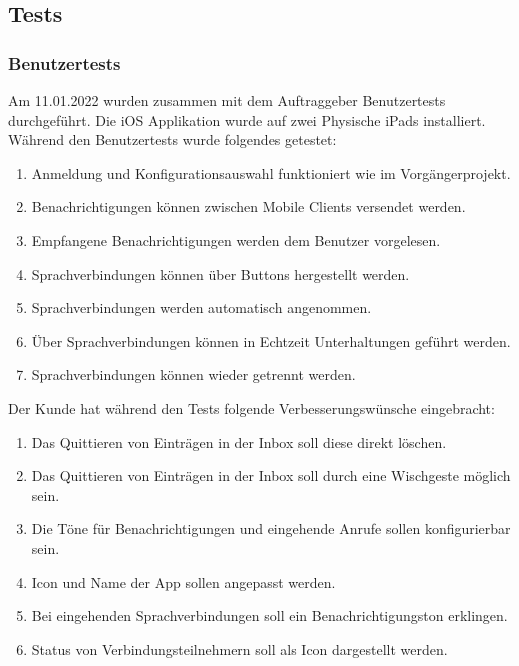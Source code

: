 \subsection{Tests}

\subsubsection{Benutzertests}

Am 11.01.2022 wurden zusammen mit dem Auftraggeber Benutzertests durchgeführt.
Die iOS Applikation wurde auf zwei Physische iPads installiert.
Während den Benutzertests wurde folgendes getestet:

\begin{enumerate}
    \item Anmeldung und Konfigurationsauswahl funktioniert wie im Vorgängerprojekt.
    \item Benachrichtigungen können zwischen Mobile Clients versendet werden.
    \item Empfangene Benachrichtigungen werden dem Benutzer vorgelesen.
    \item Sprachverbindungen können über Buttons hergestellt werden.
    \item Sprachverbindungen werden automatisch angenommen.
    \item Über Sprachverbindungen können in Echtzeit Unterhaltungen geführt werden.
    \item Sprachverbindungen können wieder getrennt werden.
\end{enumerate}

Der Kunde hat während den Tests folgende Verbesserungswünsche eingebracht:

\begin{enumerate}
    \item Das Quittieren von Einträgen in der Inbox soll diese direkt löschen.
    \item Das Quittieren von Einträgen in der Inbox soll durch eine Wischgeste möglich sein.
    \item Die Töne für Benachrichtigungen und eingehende Anrufe sollen konfigurierbar sein.
    \item Icon und Name der App sollen angepasst werden.
    \item Bei eingehenden Sprachverbindungen soll ein Benachrichtigungston erklingen.
    \item Status von Verbindungsteilnehmern soll als Icon dargestellt werden.
\end{enumerate}

